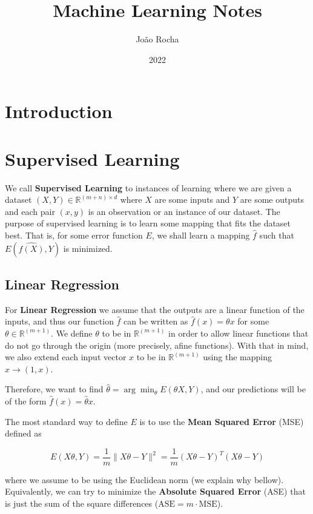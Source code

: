 \documentclass{article}
\title{Machine Learning Notes}
\date{2022}
\author{João Rocha}
\newcommand{\R}{\mathbb{R}}
\begin{document}
\maketitle

\section{Introduction}

\section{Supervised Learning}

We call \textbf{Supervised Learning} to instances of learning where we are given a dataset $(X, Y) \in \R^{(m + n) \times d}$ where $X$ are some inputs and $Y$ are some outputs and each pair $(x, y)$ is an observation or an instance of our dataset. 
The purpose of supervised learning is to learn some mapping that fits the dataset best. 
That is, for some error function $E$, we shall learn a mapping $\hat{f}$ such that $E(\hat{f(X)}, Y)$ is minimized.

\subsection{Linear Regression}

For \textbf{Linear Regression} we assume that the outputs are a linear function of the inputs, and thus our function $\hat{f}$ can be written as $\hat{f}(x) = \theta x$ for some $\theta \in \R^{(m+1)}$.
We define $\theta$ to be in $\R^{(m+1)}$ in order to allow linear functions that do not go through the origin (more precisely, afine functions).
With that in mind, we also extend each input vector $x$ to be in $\R^{(m+1)}$ using the mapping $x \to (1, x)$.

Therefore, we want to find $\hat{\theta} = \arg \min_\theta E(\theta X, Y)$, and our predictions will be of the form $\hat{f}(x) = \hat{\theta}x$.

The most standard way to define $E$ is to use the \textbf{Mean Squared Error} (MSE) defined as 

$$
E(X \theta, Y) = \frac{1}{m} \|X \theta - Y\|^2 = \frac{1}{m} (X \theta - Y)^T (X \theta - Y)
$$

where we assume to be using the Euclidean norm (we explain why bellow).
Equivalently, we can try to minimize the \textbf{Absolute Squared Error} (ASE) that is just the sum of the square differences ($\text{ASE} = m \cdot \text{MSE}$).
\end{document}
